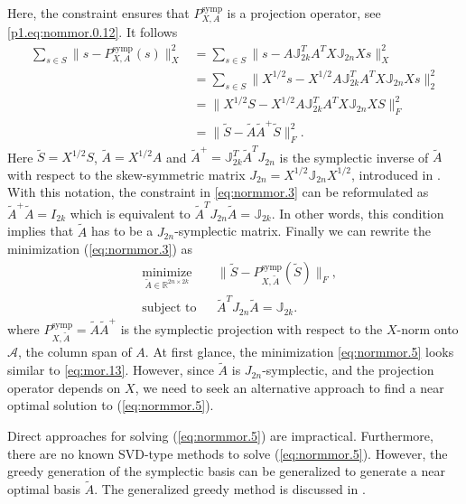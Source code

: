 Here, the constraint ensures that $P_{X,A}^{\text{symp}}$ is a projection operator, see \eqref{p1.eq:nommor.0.12}. It follows
\begin{equation} \label{eq:normmor.4}
\begin{aligned}
	\sum_{s\in S} \| s - P_{X,A}^{\text{symp}}(s) \|_X^2 &= \sum_{s\in S} \| s - A \mathbb J_{2k}^T A^T X \mathbb J_{2n} Xs \|_X^2 \\
	&= \sum_{s\in S} \| X^{1/2}s - X^{1/2} A \mathbb J_{2k}^T A^T X \mathbb J_{2n} X s \|_2^2 \\
	&= \| X^{1/2} S - X^{1/2} A \mathbb J_{2k}^T A^T X \mathbb J_{2n} X S \|_F^2 \\
	&= \| \tilde S - \tilde A \tilde A ^+ \tilde S \|_F^2.
\end{aligned}
\end{equation}
Here $\tilde S = X^{1/2} S$, $\tilde A = X^{1/2} A$ and $\tilde A^+ = \mathbb J_{2k}^T \tilde A^T J_{2n}$ is the symplectic inverse of $\tilde A$ with respect to the skew-symmetric matrix $J_{2n} = X^{1/2} \mathbb J_{2n} X^{1/2}$, introduced in . With this notation, the constraint in \eqref{eq:normmor.3} can be reformulated as $\tilde A ^+ \tilde A = I_{2k}$ which is equivalent to $\tilde A ^T J_{2n} \tilde A = \mathbb J_{2k}$. In other words, this condition implies that $\tilde A$ has to be a $J_{2n}$-symplectic matrix. Finally we can rewrite the minimization (\ref{eq:normmor.3}) as
\begin{equation} \label{eq:normmor.5}
\begin{aligned}
& \underset{\tilde A\in \mathbb{R}^{2n\times 2k}}{\text{minimize}}
& & \| \tilde S - P^\text{symp}_{X,\tilde A}(\tilde S) \|_F, \\
& \text{subject to}
& & \tilde A^T J_{2n} \tilde A = \mathbb J_{2k}.
\end{aligned}
\end{equation}
where $P^\text{symp}_{X,\tilde A} = \tilde A \tilde A^+$ is the symplectic projection with respect to the $X$-norm onto $\mathcal A$, the column span of $A$. At first glance, the minimization \eqref{eq:normmor.5} looks similar to \eqref{eq:mor.13}. However, since $\tilde A$ is $J_{2n}$-symplectic, and the projection operator depends on $X$, we need to seek an alternative approach to find a near optimal solution to (\ref{eq:normmor.5}). 

Direct approaches for solving (\ref{eq:normmor.5}) are impractical. Furthermore, there are no known SVD-type methods to solve (\ref{eq:normmor.5}). However, the greedy generation of the symplectic basis can be generalized to generate a near optimal basis $\tilde A$. The generalized greedy method is discussed in .

